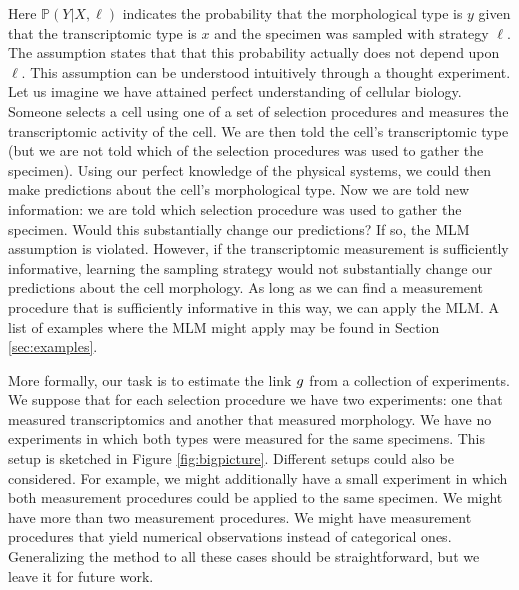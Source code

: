 Here $\mathbb{P}(Y|X,\ell)$ indicates the probability that the morphological type is $y$ given that the transcriptomic type is $x$ and the specimen was sampled with strategy $\ell$.  The assumption states that that this probability actually does not depend upon $\ell$.  This assumption can be understood intuitively through a thought experiment.  Let us imagine we have attained perfect understanding of cellular biology.  Someone selects a cell using one of a set of selection procedures and measures the transcriptomic activity of the cell.  We are then told the cell's transcriptomic type (but we are not told which of the selection procedures was used to gather the specimen).  Using our perfect knowledge of the physical systems, we could then make predictions about the cell's morphological type.  Now we are told new information: we are told which selection procedure was used to gather the specimen.  Would this substantially change our predictions?  If so, the MLM assumption is violated.  However, if the transcriptomic measurement is sufficiently informative, learning the sampling strategy would not substantially change our predictions about the cell morphology.  As long as we can find a measurement procedure that is sufficiently informative in this way, we can apply the MLM.  A list of examples where the MLM might apply may be found in Section \ref{sec:examples}.

More formally, our task is to estimate the link $g$ from a collection of experiments.  We suppose that for each selection procedure we have two experiments: one that measured transcriptomics and another that measured morphology.  We have no experiments in which both types were measured for the same specimens.  This setup is sketched in Figure \ref{fig:bigpicture}.  Different setups could also be considered.   For example, we might additionally have a small experiment in which both measurement procedures could be applied to the same specimen.  We might have more than two measurement procedures.  We might have measurement procedures that yield numerical observations instead of categorical ones.  Generalizing the method to all these cases should be straightforward, but we leave it for future work.  

